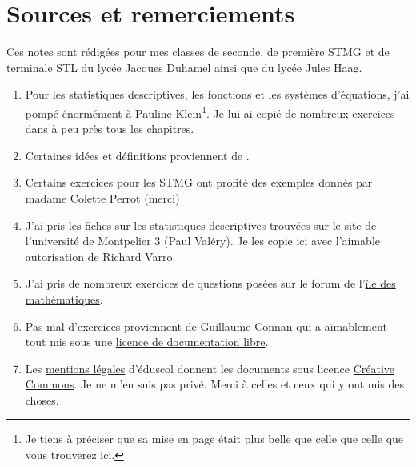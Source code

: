
\section*{Sources et remerciements}

Ces notes sont rédigées pour mes classes de seconde, de première STMG et de terminale STL du lycée Jacques Duhamel ainsi que du lycée Jules Haag.

\begin{enumerate}
    \item
        Pour les statistiques descriptives, les fonctions et les systèmes d'équations, j'ai pompé énormément à Pauline Klein\footnote{Je tiens à préciser que sa mise en page était plus belle que celle que celle que vous trouverez ici.}. Je lui ai copié de nombreux exercices dans à peu près tous les chapitres.
    \item
        Certaines idées et définitions proviennent de \cite{oklaEg}.
    \item
        Certains exercices pour les STMG ont profité des exemples donnés par madame Colette Perrot (merci) 
    \item
        J'ai pris les fiches \cite{qyKnLf} sur les statistiques descriptives trouvées sur le site de l'université de Montpelier 3 (Paul Valéry). Je les copie ici avec l'aimable autorisation de Richard Varro.
    \item
        J'ai pris de nombreux exercices de questions posées sur le forum de l'\href{http://www.ilemaths.net/forum_lycee.php}{île des mathématiques}.
    \item
        Pas mal d'exercices proviennent de \href{http://tehessin.tuxfamily.org/?page=35}{Guillaume Connan} qui a aimablement tout mis sous une \href{http://guilde.jeunes-chercheurs.org/Guilde/Licence/ldl.html}{licence de documentation libre}.
    \item
        Les \href{http://eduscol.education.fr/cid49154/mentions-legales.html}{mentions légales} d'éduscol donnent les documents sous licence \href{http://creativecommons.org/licenses/by-nc-sa/2.0/fr/}{Créative Commons}. Je ne m'en suis pas privé. Merci à celles et ceux qui y ont mis des choses.
\end{enumerate}

